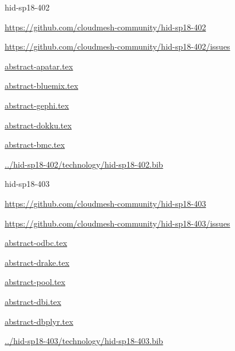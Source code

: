 \begin{IU}

hid-sp18-402

\url{https://github.com/cloudmesh-community/hid-sp18-402}

\url{https://github.com/cloudmesh-community/hid-sp18-402/issues}

\href{https://github.com/cloudmesh-community/hid-sp18-402/blob/master//technology/abstract-apatar.tex}{abstract-apatar.tex}

\href{https://github.com/cloudmesh-community/hid-sp18-402/blob/master//technology/abstract-bluemix.tex}{abstract-bluemix.tex}

\href{https://github.com/cloudmesh-community/hid-sp18-402/blob/master//technology/abstract-gephi.tex}{abstract-gephi.tex}

\href{https://github.com/cloudmesh-community/hid-sp18-402/blob/master//technology/abstract-dokku.tex}{abstract-dokku.tex}

\href{https://github.com/cloudmesh-community/hid-sp18-402/blob/master//technology/abstract-bmc.tex}{abstract-bmc.tex}

\href{https://github.com/cloudmesh-community/hid-sp18-402/blob/master//technology/hid-sp18-402.bib}{../hid-sp18-402/technology/hid-sp18-402.bib}

\end{IU}


\begin{IU}

hid-sp18-403

\url{https://github.com/cloudmesh-community/hid-sp18-403}

\url{https://github.com/cloudmesh-community/hid-sp18-403/issues}

\href{https://github.com/cloudmesh-community/hid-sp18-403/blob/master//technology/abstract-odbc.tex}{abstract-odbc.tex}

\href{https://github.com/cloudmesh-community/hid-sp18-403/blob/master//technology/abstract-drake.tex}{abstract-drake.tex}

\href{https://github.com/cloudmesh-community/hid-sp18-403/blob/master//technology/abstract-pool.tex}{abstract-pool.tex}

\href{https://github.com/cloudmesh-community/hid-sp18-403/blob/master//technology/abstract-dbi.tex}{abstract-dbi.tex}

\href{https://github.com/cloudmesh-community/hid-sp18-403/blob/master//technology/abstract-dbplyr.tex}{abstract-dbplyr.tex}

\href{https://github.com/cloudmesh-community/hid-sp18-403/blob/master//technology/hid-sp18-403.bib}{../hid-sp18-403/technology/hid-sp18-403.bib}

\end{IU}


